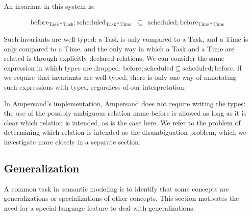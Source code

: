 \documentclass[12pt]{article}
\begin{document}
An invariant in this system is:

\begin{eqnarray}
    \mathrm{before}_{\mathrm{Task * Task}};\mathrm{scheduled}_{\mathrm{Task * Time}}&\subseteq&\mathrm{scheduled};\mathrm{before}_{\mathrm{Time * Time}}
    \label{eqn:well-typed example}
\end{eqnarray}

Such invariants are well-typed: a Task is only compared to a Task, and a Time is only compared to a Time, and the only way in which a Task and a Time are related is through explicitly declared relations.
We can consider the same expression in which types are dropped: $\mathrm{before};\mathrm{scheduled} \subseteq \mathrm{scheduled};\mathrm{before}$.
If we require that invariants are well-typed, there is only one way of annotating such expressions with types, regardless of our interpretation.

In Ampersand's implementation, Ampersand does not require writing the types: the use of the possibly ambiguous relation name $\mathrm{before}$ is allowed as long as it is clear which relation is intended, as is the case here.
We refer to the problem of determining which relation is intended as the disambiguation problem, which we investigate more closely in a separate section.

\subsection{Generalization}
A common task in semantic modeling is to identify that some concepts are generalizations or specializations of other concepts.
This section motivates the need for a special language feature to deal with generalizations.
\end{document}
